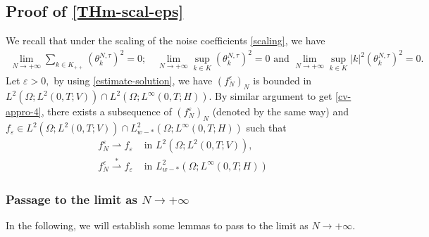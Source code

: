 \documentclass[a4paper,12pt, reqno]{amsart}
\begin{document}
 \subsection{Proof of \autoref{THm-scal-eps}}\label{sec:limN}
 We recall that under   the    scaling of  the noise coefficients \eqref{scaling},  we have  
  \begin{align}\label{coefficient}    \lim_{N\to +\infty}\sum_{k\in K_{++}}\left(  \theta^{N,\tau}_{k}\right)^{2}=0;\quad 
 \lim_{N\to +\infty}\sup_{k\in K}\left(  \theta^{N,\tau}_{k}\right)^{2}= 0 \text{ and }
 \lim_{N\to +\infty}\sup_{k\in K}\left\vert k\right\vert
 ^{2}\left(  \theta^{N,\tau}_{k}\right)^{2}= 0.
 \end{align}
Let $\varepsilon>0,$ by using \eqref{estimate-solution}, we have 
$(f^\varepsilon_N)_N$ is bounded in $L^2(\Omega ;L^2(0, T;V)) \cap L^2(\Omega ;L^\infty(0, T;H)).$  By similar argument to get  \eqref{cv-appro-4},  there exists    a subsequence of $(f^\varepsilon_N)_N$ (denoted by the same way) and  $f_\varepsilon \in L^2(\Omega ;L^2(0, T;V)) \cap L^2_{w-*}(\Omega ;L^\infty(0, T;H)) $ such that
      \begin{align}
 	f^\varepsilon_N \rightharpoonup f_\varepsilon &\text{		in	}  L^2(\Omega ;L^2(0, T;V)),\label{cv1-eps}\\
    f^\varepsilon_N \overset{*}{\rightharpoonup} f_\varepsilon &\text{		in	}  L^2_{w-*}(\Omega ;L^\infty(0, T;H)) \label{cv2-eps}
 	\end{align}
 
  \subsubsection{Passage to the limit as $N\to+\infty$}
   In the following,   we  will    establish   some    lemmas  to  pass    to  the limit   as  $N\to   +\infty.$\\
   
\end{document}
